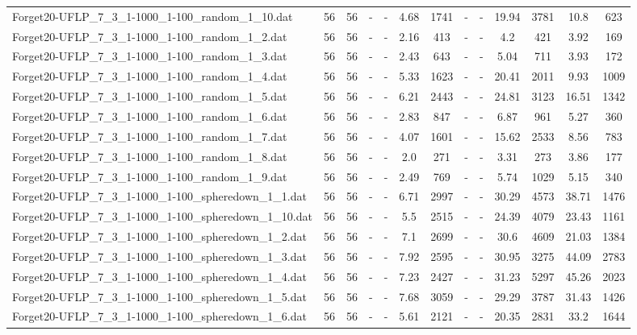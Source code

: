 \begin{table}[!ht]
{\begin{tabular}{lcccccccccccc}
Forget20-UFLP\_7\_3\_1-1000\_1-100\_random\_1\_10.dat & 56 & 56 &  - &  - & 4.68 & 1741 &  - &  - & 19.94 & 3781 & 10.8 & 623 \\
Forget20-UFLP\_7\_3\_1-1000\_1-100\_random\_1\_2.dat & 56 & 56 &  - &  - & 2.16 & 413 &  - &  - & 4.2 & 421 & 3.92 & 169 \\
Forget20-UFLP\_7\_3\_1-1000\_1-100\_random\_1\_3.dat & 56 & 56 &  - &  - & 2.43 & 643 &  - &  - & 5.04 & 711 & 3.93 & 172 \\
Forget20-UFLP\_7\_3\_1-1000\_1-100\_random\_1\_4.dat & 56 & 56 &  - &  - & 5.33 & 1623 &  - &  - & 20.41 & 2011 & 9.93 & 1009 \\
Forget20-UFLP\_7\_3\_1-1000\_1-100\_random\_1\_5.dat & 56 & 56 &  - &  - & 6.21 & 2443 &  - &  - & 24.81 & 3123 & 16.51 & 1342 \\
Forget20-UFLP\_7\_3\_1-1000\_1-100\_random\_1\_6.dat & 56 & 56 &  - &  - & 2.83 & 847 &  - &  - & 6.87 & 961 & 5.27 & 360 \\
Forget20-UFLP\_7\_3\_1-1000\_1-100\_random\_1\_7.dat & 56 & 56 &  - &  - & 4.07 & 1601 &  - &  - & 15.62 & 2533 & 8.56 & 783 \\
Forget20-UFLP\_7\_3\_1-1000\_1-100\_random\_1\_8.dat & 56 & 56 &  - &  - & 2.0 & 271 &  - &  - & 3.31 & 273 & 3.86 & 177 \\
Forget20-UFLP\_7\_3\_1-1000\_1-100\_random\_1\_9.dat & 56 & 56 &  - &  - & 2.49 & 769 &  - &  - & 5.74 & 1029 & 5.15 & 340 \\
Forget20-UFLP\_7\_3\_1-1000\_1-100\_spheredown\_1\_1.dat & 56 & 56 &  - &  - & 6.71 & 2997 &  - &  - & 30.29 & 4573 & 38.71 & 1476 \\
Forget20-UFLP\_7\_3\_1-1000\_1-100\_spheredown\_1\_10.dat & 56 & 56 &  - &  - & 5.5 & 2515 &  - &  - & 24.39 & 4079 & 23.43 & 1161 \\
Forget20-UFLP\_7\_3\_1-1000\_1-100\_spheredown\_1\_2.dat & 56 & 56 &  - &  - & 7.1 & 2699 &  - &  - & 30.6 & 4609 & 21.03 & 1384 \\
Forget20-UFLP\_7\_3\_1-1000\_1-100\_spheredown\_1\_3.dat & 56 & 56 &  - &  - & 7.92 & 2595 &  - &  - & 30.95 & 3275 & 44.09 & 2783 \\
Forget20-UFLP\_7\_3\_1-1000\_1-100\_spheredown\_1\_4.dat & 56 & 56 &  - &  - & 7.23 & 2427 &  - &  - & 31.23 & 5297 & 45.26 & 2023 \\
Forget20-UFLP\_7\_3\_1-1000\_1-100\_spheredown\_1\_5.dat & 56 & 56 &  - &  - & 7.68 & 3059 &  - &  - & 29.29 & 3787 & 31.43 & 1426 \\
Forget20-UFLP\_7\_3\_1-1000\_1-100\_spheredown\_1\_6.dat & 56 & 56 &  - &  - & 5.61 & 2121 &  - &  - & 20.35 & 2831 & 33.2 & 1644 \\

\end{tabular}}
\end{table}
